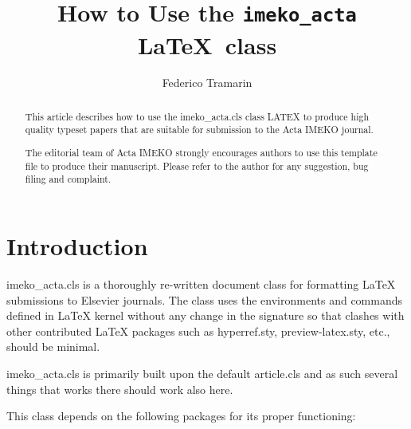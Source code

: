 \documentclass[10pt,onecolumn]{imeko_acta}
\def\file#1{\textsf{\fontsize{9.1}{9.5}\selectfont#1}\xspace}
\begin{document}
\title{How to Use the \texttt{imeko\_acta} \LaTeX\ class} %

\author[1,2]{Federico Tramarin}



\Funding{}%

\begin{abstract}
	This article describes how to use the imeko\_acta.cls class LATEX to produce high quality typeset papers that are suitable for submission to the Acta IMEKO journal.
	
	The editorial team of Acta IMEKO strongly encourages 
	authors to use this \LaTeXe template file to produce their manuscript.
	Please refer to the author for any suggestion, bug filing and complaint.
\end{abstract}

\maketitle

\section{Introduction}

\file{imeko\_acta.cls} is a thoroughly re-written document class
for formatting \LaTeX{} submissions to Elsevier journals.
The class uses the environments and commands defined in \LaTeX{} kernel
without any change in the signature so that clashes with other
contributed \LaTeX{} packages such as \file{hyperref.sty},
\file{preview-latex.sty}, etc., should be minimal.

\file{imeko\_acta.cls} is primarily built upon the default
\file{article.cls} and as such several things that works there should work also here.  

This class depends on the following packages
for its proper functioning:
\end{document}
